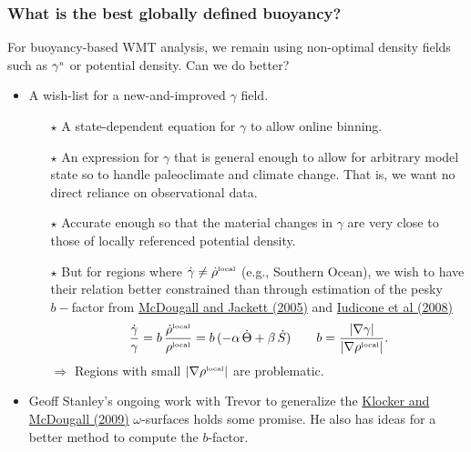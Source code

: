 \documentclass[10pt]{beamer}
\begin{document}
\begin{frame}
  \frametitle{What is the best globally defined buoyancy?}

  For buoyancy-based WMT analysis, we remain using non-optimal density
  fields such as $\gamma^{\mbox{\tiny n}}$ or potential density.  Can
  we do better? 

\begin{exampleblock}{}
\begin{itemize}

\item A wish-list for a new-and-improved $\gamma$ field.


\begin{itemize}  \footnotesize 
\item[$\star$] A state-dependent equation for $\gamma$ to allow online
  binning.

\item[$\star$] An expression for $\gamma$ that is general enough to
  allow for arbitrary model state so to handle paleoclimate and
  climate change.  That is, we want no direct reliance on observational data.

\item[$\star$] Accurate enough so that the material changes in
  $\gamma$ are very close to those of locally referenced potential
  density.  

\item[$\star$] But for regions where
  $\dot{\gamma} \ne \dot{\rho}^{\mbox{\tiny local}}$ (e.g., Southern
  Ocean), we wish to have their relation better constrained than through
  estimation of the pesky $b-$factor from 
  \href{https://doi.org/10.1357/0022240053693734}{McDougall and
    Jackett (2005)} and
  \href{https://journals.ametsoc.org/doi/10.1175/2007JPO3464.1}{Iudicone
    et al (2008)}
\begin{equation}
   \frac{\dot{\gamma}}{\gamma} = b \, \frac{\dot{\rho}^{\mbox{\tiny local}}}{\rho^{\mbox{\tiny local}} }
   = b \, (-\alpha \, \dot{\Theta} + \beta \, \dot{S})  
  \qquad b = \frac{ | \nabla \gamma| }{ | \nabla \rho^{\mbox{\tiny local}} | }. 
\end{equation}
$\Longrightarrow$ Regions with small
$|\nabla \rho^{\mbox{\tiny local}}|$ are problematic.

\end{itemize}

\item Geoff Stanley's ongoing work with Trevor to generalize the
  \href{https://www.ocean-sci.net/5/155/2009/}{Klocker and McDougall
    (2009)} $\omega$-surfaces holds some promise.  He also has ideas
  for a better method to compute the $b$-factor.

\end{itemize}
\end{exampleblock}{}

\end{frame}
\end{document}
